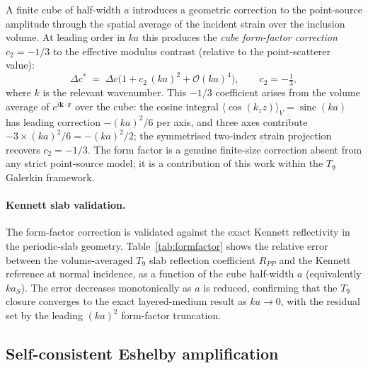 \documentclass[11pt,a4paper]{article}
\newcommand{\D}{\Delta}
\newcommand{\order}{\mathcal{O}}
\newcommand{\br}{\bm{r}}
\theoremstyle{plain}
\theoremstyle{definition}
\theoremstyle{remark}
\begin{document}
A finite cube of half-width $a$ introduces a geometric correction to the
point-source amplitude through the spatial average of the incident strain
over the inclusion volume.  At leading order in $ka$ this produces the
\emph{cube form-factor correction} $c_2 = -1/3$ to the effective modulus
contrast (relative to the point-scatterer value):
\begin{equation}
  \D c^{*} \;=\; \D c\bigl(1 + c_2\,(ka)^2 + \order{(ka)^4}\bigr),
  \qquad c_2 = -\tfrac{1}{3},
  \label{eq:formfactor}
\end{equation}
where $k$ is the relevant wavenumber.  This $-1/3$ coefficient arises from
the volume average of $e^{i\bm{k}\cdot\br}$ over the cube: the cosine
integral $\langle\cos(k_z z)\rangle_V = \operatorname{sinc}(ka)$ has
leading correction $-(ka)^2/6$ per axis, and three axes contribute
$-3\times(ka)^2/6 = -(ka)^2/2$; the symmetrised two-index strain projection
recovers $c_2 = -1/3$.  The form factor is a genuine finite-size correction
absent from any strict point-source model; it is a contribution of this work
within the $T_9$ Galerkin framework.

\paragraph{Kennett slab validation.}
The form-factor correction is validated against the exact Kennett
reflectivity \cite{kennett1983} in the periodic-slab geometry.
Table~\ref{tab:formfactor} shows the relative error between the
volume-averaged $T_9$ slab reflection coefficient $R_{PP}$ and the Kennett
reference at normal incidence, as a function of the cube half-width $a$
(equivalently $ka_S$).  The error decreases monotonically as $a$ is reduced,
confirming that the $T_9$ closure converges to the exact layered-medium
result as $ka \to 0$, with the residual set by the leading $(ka)^2$
form-factor truncation.

\begin{table}[h]
\centering

\caption{Volume-averaged $T_9$ slab vs.\ Kennett reflectivity: relative
  error in $R_{PP}$ at normal incidence as a function of cell half-width
  $a$ (background $\alpha = 5000$~m/s, $\beta = 3000$~m/s,
  $\rho_0 = 2500$~kg/m$^3$, moderate contrast
  $\D\lambda = 2$~GPa, $\D\mu = 1$~GPa, $\D\rho = 100$~kg/m$^3$).
  Provenance: \texttt{paper/evidence/formfactor\_kennett.csv}.}
\label{tab:formfactor}
\end{table}

\subsection{Self-consistent Eshelby amplification}
\label{sec:eshelby-amp}
\end{document}

